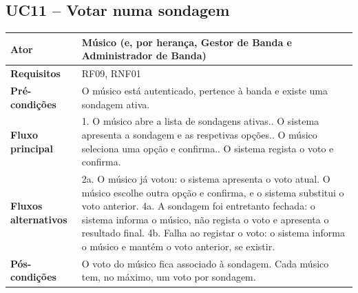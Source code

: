 \subsection{UC11 -- Votar numa sondagem}
\begin{tabular}{|p{3.2cm}|p{11cm}|}
\hline
\textbf{Ator} & Músico (e, por herança, Gestor de Banda e Administrador de Banda) \\ \hline
\textbf{Requisitos} & RF09, RNF01 \\ \hline
\textbf{Pré-condições} & O músico está autenticado, pertence à banda e existe uma sondagem ativa. \\ \hline
\textbf{Fluxo principal} &
1. O músico abre a lista de sondagens ativas.\newline
2. O sistema apresenta a sondagem e as respetivas opções.\newline
3. O músico seleciona uma opção e confirma.\newline
4. O sistema regista o voto e confirma. \\ \hline
\textbf{Fluxos alternativos} &
2a. O músico já votou: o sistema apresenta o voto atual. O músico escolhe outra opção e confirma, e o sistema substitui o voto anterior.\newline
4a. A sondagem foi entretanto fechada: o sistema informa o músico, não regista o voto e apresenta o resultado final.\newline
4b. Falha ao registar o voto: o sistema informa o músico e mantém o voto anterior, se existir. \\ \hline
\textbf{Pós-condições} & O voto do músico fica associado à sondagem. Cada músico tem, no máximo, um voto por sondagem. \\ \hline
\end{tabular}

